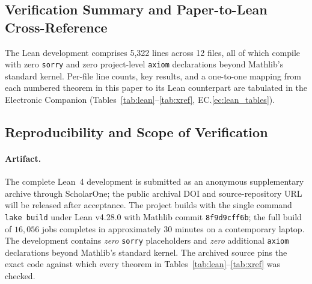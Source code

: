 \documentclass[opre,dblanonrev]{informs4}
\begin{document}
\subsection{Verification Summary and Paper-to-Lean Cross-Reference}
\label{sec:lean_summary}

The Lean development comprises 5{,}322 lines across 12 files, all of
which compile with zero \texttt{sorry} and zero project-level
\texttt{axiom} declarations beyond Mathlib's standard kernel.
Per-file line counts, key results, and a one-to-one mapping from each
numbered theorem in this paper to its Lean counterpart are tabulated
in the Electronic Companion (Tables~\ref{tab:lean}--\ref{tab:xref},
EC.\ref{ec:lean_tables}).

\subsection{Reproducibility and Scope of Verification}
\label{sec:lean_scope}

\paragraph{Artifact.}
The complete Lean~4 development is submitted as an anonymous
supplementary archive through ScholarOne; the public archival
DOI and source-repository URL will be released after acceptance.
The project builds with the single command
\texttt{lake build} under Lean v4.28.0 with Mathlib commit
\texttt{8f9d9cff6b}; the full build of $16{,}056$ jobs completes in
approximately 30 minutes on a contemporary laptop. The development
contains \emph{zero} \texttt{sorry} placeholders and \emph{zero}
additional \texttt{axiom} declarations beyond Mathlib's standard
kernel. The archived source pins the exact code against which every
theorem in Tables~\ref{tab:lean}--\ref{tab:xref} was checked.
\end{document}
